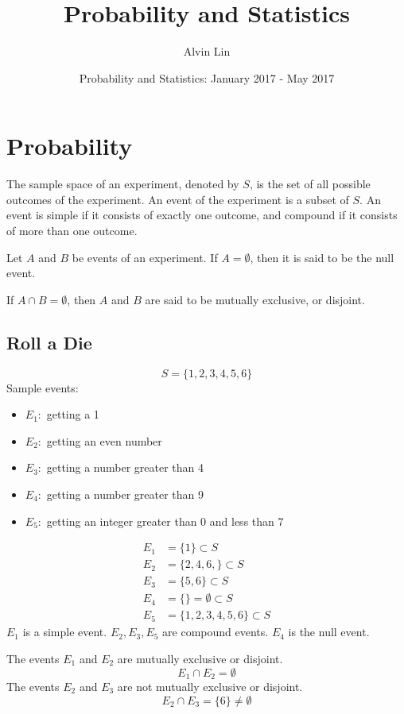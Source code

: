 \documentclass[letterpaper, 12pt]{math}
\title{Probability and Statistics}
\author{Alvin Lin}
\date{Probability and Statistics: January 2017 - May 2017}
\begin{document}
\maketitle

\section{Probability}
The sample space of an experiment, denoted by \( S \), is the set of all
possible outcomes of the experiment. An event of the experiment is a subset
of \( S \). An event is simple if it consists of exactly one outcome, and
compound if it consists of more than one outcome. \par
Let \( A \) and \( B \) be events of an experiment. If \( A = \emptyset \),
then it is said to be the null event. \par
If \( A \cap B = \emptyset \), then \( A \) and \( B \) are said to be mutually
exclusive, or disjoint.

\subsection{Roll a Die}
\[ S = \big\{ 1, 2, 3, 4, 5, 6 \big\} \]
Sample events:
\begin{itemize}
  \item \( E_{1}: \) getting a 1
  \item \( E_{2}: \) getting an even number
  \item \( E_{3}: \) getting a number greater than 4
  \item \( E_{4}: \) getting a number greater than 9
  \item \( E_{5}: \) getting an integer greater than 0 and less than 7
\end{itemize}
\begin{align*}
  E_{1} &= \big\{ 1 \big\} \subset S \\
  E_{2} &= \big\{ 2, 4, 6, \big\} \subset S \\
  E_{3} &= \big\{ 5, 6 \big\} \subset S \\
  E_{4} &= \big\{ \big\} = \emptyset \subset S \\
  E_{5} &= \big\{ 1, 2, 3, 4, 5, 6 \big\} \subset S
\end{align*}
\( E_{1} \) is a simple event. \( E_{2}, E_{3}, E_{5} \) are compound events.
\( E_{4} \) is the null event. \par
The events \( E_{1} \) and \( E_{2} \) are mutually exclusive or disjoint.
\[ E_{1} \cap E_{2} = \emptyset \]
The events \( E_{2} \) and \( E_{3} \) are not mutually exclusive or disjoint.
\[ E_{2} \cap E_{3} = \big\{ 6 \big\} \neq \emptyset \]
\end{document}
